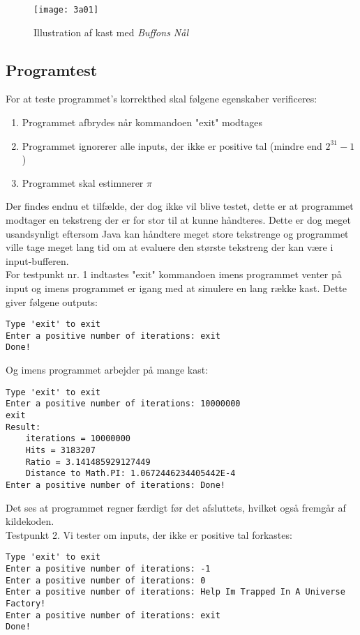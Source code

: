 	\begin{figure}[h!]
	  \centering
	      \texttt{[image: 3a01]}
	  \caption{Illustration af kast med \emph{Buffons Nål}}\label{fig:3a01}
	\end{figure}


\subsection{Programtest}
	For at teste programmet's korrekthed skal følgene egenskaber verificeres:
	\begin{enumerate}
		\item Programmet afbrydes når kommandoen "exit" modtages
		\item Programmet ignorerer alle inputs, der ikke er positive tal (mindre end $2^31-1$)
		\item Programmet skal estimnerer $\pi$
	\end{enumerate}
	Der findes endnu et tilfælde, der dog ikke vil blive testet, dette er at programmet modtager en tekstreng der er for stor til at kunne håndteres.
	Dette er dog meget usandsynligt eftersom Java kan håndtere meget store tekstrenge og programmet ville tage meget lang tid om at evaluere den største tekstreng der kan være i input-bufferen. \\
	
	For testpunkt nr. 1 indtastes "exit" kommandoen imens programmet venter på input og imens programmet er igang med at simulere en lang række kast.
	Dette giver følgene outputs:
	\begin{lstlisting}[caption=Output fra testsekvens]
Type 'exit' to exit
Enter a positive number of iterations: exit
Done!
	\end{lstlisting}
	Og imens programmet arbejder på mange kast:
	\begin{lstlisting}[caption=Output fra testsekvens imens programmet evaluerer]
Type 'exit' to exit
Enter a positive number of iterations: 10000000
exit
Result: 
 	iterations = 10000000
	Hits = 3183207
	Ratio = 3.141485929127449
	Distance to Math.PI: 1.0672446234405442E-4
Enter a positive number of iterations: Done!
	\end{lstlisting}
	Det ses at programmet regner færdigt før det afsluttets, hvilket også fremgår af kildekoden.\\
	
	Testpunkt 2. Vi tester om inputs, der ikke er positive tal forkastes:
	\begin{lstlisting}[caption==Output fra testsekvens 2]
Type 'exit' to exit
Enter a positive number of iterations: -1
Enter a positive number of iterations: 0
Enter a positive number of iterations: Help Im Trapped In A Universe Factory!
Enter a positive number of iterations: exit
Done!
	\end{lstlisting}
	

